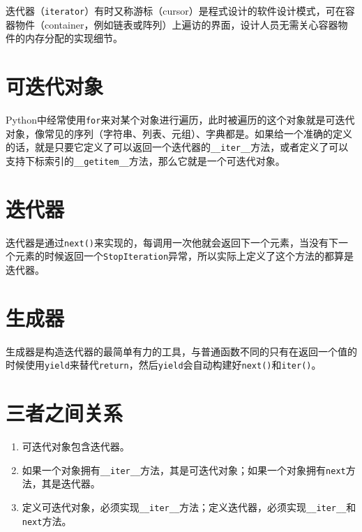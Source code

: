 \documentclass[]{ctexbook}
\providecommand{\tightlist}{%
  \setlength{\itemsep}{0pt}\setlength{\parskip}{0pt}}
\begin{document}
迭代器（\texttt{iterator}）有时又称游标（cursor）是程式设计的软件设计模式，可在容器物件（container，例如链表或阵列）上遍访的界面，设计人员无需关心容器物件的内存分配的实现细节。

\hypertarget{ux53efux8fedux4ee3ux5bf9ux8c61}{%
\section{可迭代对象}\label{ux53efux8fedux4ee3ux5bf9ux8c61}}

Python中经常使用\texttt{for}来对某个对象进行遍历，此时被遍历的这个对象就是可迭代对象，像常见的序列（字符串、列表、元组）、字典都是。如果给一个准确的定义的话，就是只要它定义了可以返回一个迭代器的\texttt{\_\_iter\_\_}方法，或者定义了可以支持下标索引的\texttt{\_\_getitem\_\_}方法，那么它就是一个可迭代对象。

\hypertarget{ux8fedux4ee3ux5668}{%
\section{迭代器}\label{ux8fedux4ee3ux5668}}

迭代器是通过\texttt{next()}来实现的，每调用一次他就会返回下一个元素，当没有下一个元素的时候返回一个\texttt{StopIteration}异常，所以实际上定义了这个方法的都算是迭代器。

\hypertarget{ux751fux6210ux5668}{%
\section{生成器}\label{ux751fux6210ux5668}}

生成器是构造迭代器的最简单有力的工具，与普通函数不同的只有在返回一个值的时候使用\texttt{yield}来替代\texttt{return}，然后\texttt{yield}会自动构建好\texttt{next()}和\texttt{iter()}。

\hypertarget{ux4e09ux8005ux4e4bux95f4ux5173ux7cfb}{%
\section{三者之间关系}\label{ux4e09ux8005ux4e4bux95f4ux5173ux7cfb}}

\begin{enumerate}
\def\labelenumi{\arabic{enumi}.}
\tightlist
\item
  可迭代对象包含迭代器。
\item
  如果一个对象拥有\texttt{\_\_iter\_\_}方法，其是可迭代对象；如果一个对象拥有\texttt{next}方法，其是迭代器。
\item
  定义可迭代对象，必须实现\texttt{\_\_iter\_\_}方法；定义迭代器，必须实现\texttt{\_\_iter\_\_}和\texttt{next}方法。
\end{enumerate}
\end{document}
